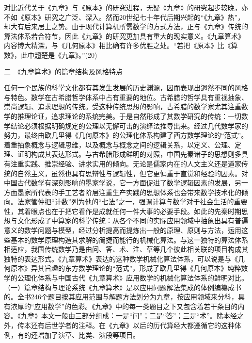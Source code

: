 \documentclass[12pt,UTF8]{ctexbook}
\begin{document}
对比近代关于《九章》与《原本》的研究进程，无疑《九章》的研究起步较晚，亦不如《原本》研究之广泛、深入。然而20世纪七十年代后期兴起的“《九章》热”，却大有后来居上之势。由于现代计算机所需数学的方式方法，正与《九章》传统的算法体系若合符节，因此《九章》的研究更加具有重大的现实意义。《九章算术》内容博大精深，与《几何原本》相比确有许多优胜之处。“若把《原本》比《算数》，此中翘楚是《九章》。”(20)

二　《九章算术》的篇章结构及风格特点

任何一个民族的科学文化都有其发生发展的历史渊源，因而表现出迥然不同的风格与特色。数学在古希腊哲学体系中占有重要的地位。古希腊的哲学具有重视抽象、崇尚逻辑、追求理想的传统。受这种传统思想的影响，古希腊的数学家尤其注重数学的推理论证，追求理论的系统完美。于是自然形成了其数学研究的传统：一切数学结论必须根据明确规定的公理以无懈可击的演绎法推导出来。经过几代数学家的努力，最终由欧几里得《几何原本》的公理化体系构建了西方数学理论的“范式”。着重抽象概念与逻辑思维，以及概念与概念之间的逻辑关系，以定义、公理、定理、证明构成其表达形式。与古希腊形成鲜明的对照，中国先秦诸子的思想则多具有注重实践、推崇经验、讲求实用的倾向。无论是儒家内在的人文主义还是道家传统的自然主义，虽然也具有思辩性与逻辑性，但它更偏重于直觉和经验的因素。对中国古代数学有深刻影响的墨家学说，它一方面促进了数学逻辑因素的发展，另一方面墨家所代表的手工艺者阶层注重生产实践的思想体系也会带来数学技术化的倾向。法家管仲把“计数”列为他的“七法”之一，强调计算与数学对于社会生活的重要性，其着眼点也在于把它看作是成就任何一件大事的必要手段。如此的先秦时期思想与文化形成了中算家的科学传统：从各个不同的实际应用领域中抽象出具有普遍意义的数学问题与模型，经过分析提高而提炼出一般的原理、原则与方法，运用这些基本的数学原理构造其求解的简捷而能行的机械化算法。与这一独特的算法体系相适应，我国传统数学乃是由问、答、术、注、草等几个彼此相关联的项目构成其独特的表达形式。《九章算术》表达的这种数学机械化算法体系，可以说是与《几何原本》异其旨趣的东方数学理论的“范式”，形成了欧几里得《几何原本》纯粹数学的公理化体系与中国古代《九章算术》应用数学的机械化算法体系的鲜明对比。
（一）篇章结构与理论系统《九章算术》是以应用问题解法集成的体例编纂成书的。全书246个题目按其应用范围与解题方法划分为九章，按应用领域来分科，具有浓厚的“应用数学”的色彩。《九章》中的每一类题目之下又包含着若干条目的内容。《九章》本文一般由三部分组成：一是“问”；二是“答”；三是“术”。除本经之外，传本还有后世学者的注释。在《九章》以后的历代算经大都遵循它的这种体例，有的还增加了演草、比类、演段等项目。
\end{document}
